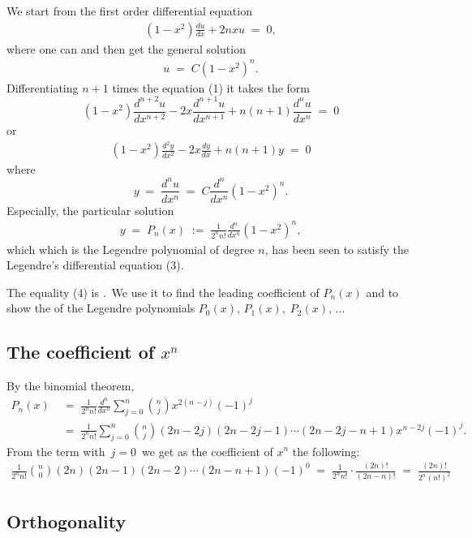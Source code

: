 \documentclass[12pt]{article}
\begin{document}
We start from the first order differential equation
\begin{align}
(1\!-\!x^2)\frac{du}{dx}+2nxu \;=\; 0,
\end{align}
where one can  and then get the general solution
\begin{align}
u \;=\; C(1\!-\!x^2)^n.
\end{align}
Differentiating $n\!+\!1$ times the equation (1) it takes the form
$$(1\!-\!x^2)\frac{d^{n+2}u}{dx^{n+2}}-2x\frac{d^{n+1}u}{dx^{n+1}}+n(n+1)\frac{d^{n}u}{dx^{n}} \;=\; 0$$
or
\begin{align}
(1\!-\!x^2)\frac{d^2y}{dx^2}-2x\frac{dy}{dx}+n(n+1)y \;=\; 0
\end{align}
where
$$y \;=\; \frac{d^nu}{dx^n} \;=\; C\frac{d^n}{dx^n}(1\!-\!x^2)^n.$$
Especially, the particular solution
\begin{align}
y \;=\; P_n(x) \;:=\; \frac{1}{2^nn!}\frac{d^n}{dx^n}(1\!-\!x^2)^n,
\end{align}
which which is the Legendre polynomial of degree $n$, has been seen to satisfy the Legendre's differential equation (3).

The equality (4) is .\, We use it to find the leading coefficient of $P_n(x)$ and to show the  of the Legendre polynomials $P_0(x),\,P_1(x),\;P_2(x),\,...$

\subsection{The coefficient of $x^n$}

By the binomial theorem, 
\begin{align*}
P_n(x) &\;=\; \frac{1}{2^nn!}\frac{d^n}{dx^n}\sum_{j=0}^n{n \choose j}x^{2(n-j)}(-1)^j\\
 &\;=\; \frac{1}{2^nn!}\sum_{j=0}^n{n \choose j}(2n\!-\!2j)(2n\!-\!2j\!-\!1)\cdots(2n\!-\!2j\!-\!n\!+\!1)x^{n-2j}(-1)^j.
\end{align*}
From the term with\, $j = 0$\, we get as the coefficient of $x^n$ the following:
\begin{align}
\frac{1}{2^nn!}{n\choose0}(2n)(2n\!-\!1)(2n\!-\!2)\cdots(2n\!-\!n\!+\!1)(-1)^0
\;=\; \frac{1}{2^nn!}\cdot\frac{(2n)!}{(2n\!-\!n)!} \;=\; \frac{(2n)!}{2^n(n!)^2}
\end{align}


\subsection{Orthogonality}
\end{document}
